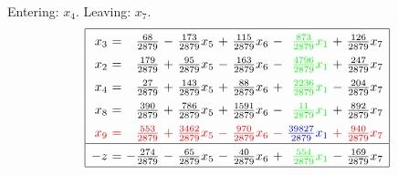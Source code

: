 \documentclass[11pt]{article}
\begin{document}
Entering: $x_{4}$. Leaving: $x_{7}$. 
\begin{equation*}
\renewcommand{\arraystretch}{1.5} %
\begin{array}{|rcrcrcrcrcr|}
\hline
x_{3} \mspace{-6mu}&\mspace{-6mu} = \mspace{-6mu}&\mspace{-6mu} \frac{68}{2879} \mspace{-6mu}&\mspace{-6mu} - \mspace{-6mu}&\mspace{-6mu} \frac{173}{2879} x_{5} \mspace{-6mu}&\mspace{-6mu} + \mspace{-6mu}&\mspace{-6mu} \frac{115}{2879} x_{6} \mspace{-6mu}&\mspace{-6mu} - \mspace{-6mu}&\color{green}\mspace{-6mu} \frac{873}{2879} x_{1} \mspace{-6mu}&\mspace{-6mu} + \mspace{-6mu}&\mspace{-6mu} \frac{126}{2879} x_{7}\\
x_{2} \mspace{-6mu}&\mspace{-6mu} = \mspace{-6mu}&\mspace{-6mu} \frac{179}{2879} \mspace{-6mu}&\mspace{-6mu} + \mspace{-6mu}&\mspace{-6mu} \frac{95}{2879} x_{5} \mspace{-6mu}&\mspace{-6mu} - \mspace{-6mu}&\mspace{-6mu} \frac{163}{2879} x_{6} \mspace{-6mu}&\mspace{-6mu} - \mspace{-6mu}&\color{green}\mspace{-6mu} \frac{4796}{2879} x_{1} \mspace{-6mu}&\mspace{-6mu} + \mspace{-6mu}&\mspace{-6mu} \frac{247}{2879} x_{7}\\
x_{4} \mspace{-6mu}&\mspace{-6mu} = \mspace{-6mu}&\mspace{-6mu} \frac{27}{2879} \mspace{-6mu}&\mspace{-6mu} + \mspace{-6mu}&\mspace{-6mu} \frac{143}{2879} x_{5} \mspace{-6mu}&\mspace{-6mu} + \mspace{-6mu}&\mspace{-6mu} \frac{88}{2879} x_{6} \mspace{-6mu}&\mspace{-6mu} + \mspace{-6mu}&\color{green}\mspace{-6mu} \frac{2236}{2879} x_{1} \mspace{-6mu}&\mspace{-6mu} - \mspace{-6mu}&\mspace{-6mu} \frac{204}{2879} x_{7}\\
x_{8} \mspace{-6mu}&\mspace{-6mu} = \mspace{-6mu}&\mspace{-6mu} \frac{390}{2879} \mspace{-6mu}&\mspace{-6mu} + \mspace{-6mu}&\mspace{-6mu} \frac{786}{2879} x_{5} \mspace{-6mu}&\mspace{-6mu} + \mspace{-6mu}&\mspace{-6mu} \frac{1591}{2879} x_{6} \mspace{-6mu}&\mspace{-6mu} - \mspace{-6mu}&\color{green}\mspace{-6mu} \frac{11}{2879} x_{1} \mspace{-6mu}&\mspace{-6mu} + \mspace{-6mu}&\mspace{-6mu} \frac{892}{2879} x_{7}\\
\color{red}x_{9} \mspace{-6mu}&\color{red}\mspace{-6mu} = \mspace{-6mu}&\color{red}\mspace{-6mu} \frac{553}{2879} \mspace{-6mu}&\color{red}\mspace{-6mu} + \mspace{-6mu}&\color{red}\mspace{-6mu} \frac{3462}{2879} x_{5} \mspace{-6mu}&\color{red}\mspace{-6mu} - \mspace{-6mu}&\color{red}\mspace{-6mu} \frac{970}{2879} x_{6} \mspace{-6mu}&\color{red}\mspace{-6mu} - \mspace{-6mu}&\color{blue}\mspace{-6mu} \frac{39827}{2879} x_{1} \mspace{-6mu}&\color{red}\mspace{-6mu} + \mspace{-6mu}&\color{red}\mspace{-6mu} \frac{940}{2879} x_{7}\\
\hline
-z \mspace{-6mu}&\mspace{-6mu} = \mspace{-6mu}&\mspace{-6mu} -\frac{274}{2879} \mspace{-6mu}&\mspace{-6mu} - \mspace{-6mu}&\mspace{-6mu} \frac{65}{2879} x_{5} \mspace{-6mu}&\mspace{-6mu} - \mspace{-6mu}&\mspace{-6mu} \frac{40}{2879} x_{6} \mspace{-6mu}&\mspace{-6mu} + \mspace{-6mu}&\color{green}\mspace{-6mu} \frac{554}{2879} x_{1} \mspace{-6mu}&\mspace{-6mu} - \mspace{-6mu}&\mspace{-6mu} \frac{169}{2879} x_{7}\\
\hline
\end{array}
\end{equation*}
\end{document}
